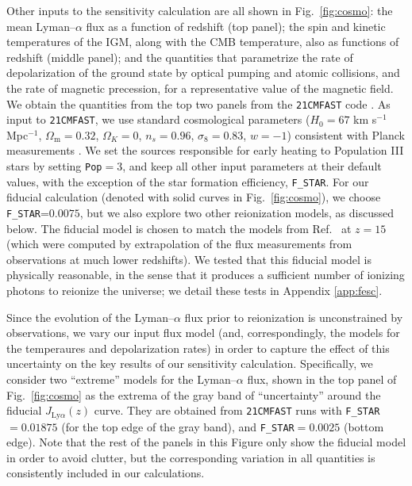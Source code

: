 Other inputs to the sensitivity calculation are all shown in Fig.~\ref{fig:cosmo}: the mean Lyman--$\alpha$ flux as a function of redshift (top panel); the spin and kinetic temperatures of the IGM, along with the CMB temperature, also as functions of redshift (middle panel); and the quantities that parametrize the rate of depolarization of the ground state by optical pumping and atomic collisions, and the rate of magnetic precession, for a representative value of the magnetic field. We obtain the quantities from the top two panels from the \texttt{21CMFAST} code \cite{2011MNRAS.411..955M}. As input to \texttt{21CMFAST}, we use standard cosmological parameters ($H_0=67$ km s$^{-1}$ Mpc$^{-1}$, $\Omega_\text{m}=0.32$, $\Omega_K=0$, $n_s=0.96$, $\sigma_8=0.83$, $w=-1$) consistent with Planck measurements \cite{2015arXiv150201589P}. We set the sources responsible for early heating to Population III stars by setting \verb|Pop|$=3$, and keep all other input parameters at their default values, with the exception of the star formation efficiency, \verb|F_STAR|. For our fiducial calculation (denoted with solid curves in Fig.~\ref{fig:cosmo}), we choose \verb|F_STAR|=$0.0075$, but we also explore two other reionization models, as discussed below. The fiducial model is chosen to match the models from Ref.~\cite{2012ApJ...746..125H} at $z=15$ (which were computed by extrapolation of the flux measurements from observations at much lower redshifts). We tested that this fiducial model is physically reasonable, in the sense that it produces a sufficient number of ionizing photons to reionize the universe; we detail these tests in Appendix \ref{app:fesc}. 

Since the evolution of the Lyman--$\alpha$ flux prior to reionization is unconstrained by observations, we vary our input flux model (and, correspondingly, the models for the temperaures and depolarization rates) in order to capture the effect of this uncertainty on the key results of our sensitivity calculation. Specifically, we consider two ``extreme'' models for the Lyman--$\alpha$ flux, shown in the top panel of Fig.~\ref{fig:cosmo} as the extrema of the gray band of ``uncertainty'' around the fiducial $J_{\text{Ly}\alpha}(z)$ curve. They are obtained from \texttt{21CMFAST} runs with \verb|F_STAR|$=0.01875$  (for the top edge of the gray band), and \verb|F_STAR|$=0.0025$ (bottom edge).  Note that the rest of the panels in this Figure only show the fiducial model in order to avoid clutter, but the corresponding variation in all quantities is consistently included in our calculations. 


